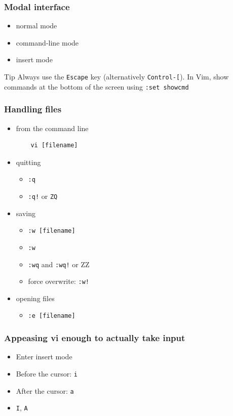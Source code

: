 \documentclass[%
        hyperref={%
                pdfauthor={Zakariyya Mughal},%
                pdfpagemode={None},pdfpagelayout={SinglePage}}%
        xcolor={x11names},%
]{beamer}
\newenvironment{indented}{\begin{adjustwidth}{1.5em}{}}{\end{adjustwidth}}
\begin{document}
\begin{frame}
\frametitle{Modal interface}
\begin{itemize}
\item normal mode
\item command-line mode
\item insert mode
\end{itemize}
\pause
\begin{beamerboxesrounded}{Tip}
Always use the \Verb+Escape+ key (alternatively \Verb+Control-[+).
In Vim, show commands at the bottom of the screen using \Verb+:set showcmd+
\end{beamerboxesrounded}
\end{frame}

\begin{frame}[fragile]
\frametitle{Handling files}
\begin{itemize}
\item from the command line
	\begin{indented}
	\begin{Verbatim}
	vi [filename]
	\end{Verbatim}
	\end{indented}
\pause \item quitting
	\begin{itemize}
	\item \Verb+:q+
	\item \Verb+:q!+ or \Verb+ZQ+
	\end{itemize}
\pause \item saving
	\begin{itemize}
	\item \Verb+:w [filename]+
	\item \Verb+:w+
	\item \Verb+:wq+ and \Verb+:wq!+ or ZZ
	\item force overwrite: \Verb+:w!+
	\end{itemize}
\pause \item opening files
	\begin{itemize}
	\item \Verb+:e [filename]+
	\end{itemize}
\end{itemize}
\end{frame}

\begin{frame}
\frametitle{Appeasing vi enough to actually take input}
\begin{itemize}
\item Enter insert mode
\item Before the cursor: \Verb+i+
\item After the cursor: \Verb+a+
\item \Verb+I+, \Verb+A+
\end{itemize}
\end{frame}
\end{document}
